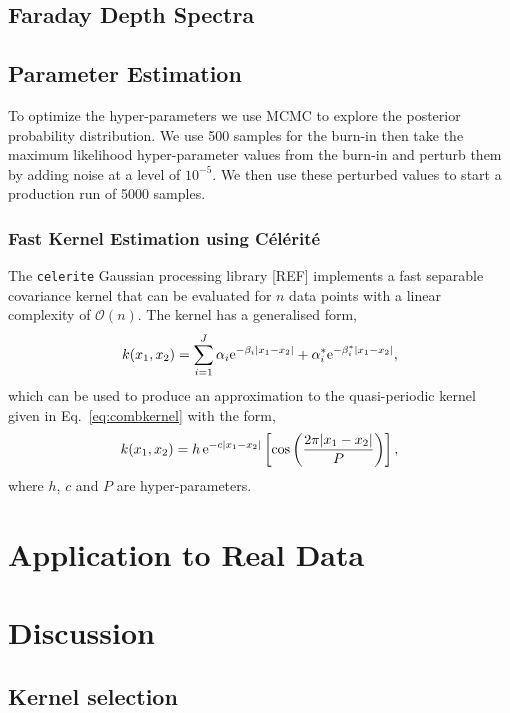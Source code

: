 \documentclass[fleqn,usenatbib]{mnras}
\begin{document}
\subsection{Faraday Depth Spectra}

\subsection{Parameter Estimation}

To optimize the hyper-parameters we use MCMC to explore the posterior probability distribution. We use 500 samples for the burn-in then take the maximum likelihood hyper-parameter values from the burn-in and perturb them by adding noise at a level of $10^{-5}$. We then use these perturbed values to start a production run of 5000 samples.

\subsubsection{Fast Kernel Estimation using C{\'e}l{\'e}rit{\'e}}

The {\tt celerite} Gaussian processing library [REF] implements a fast separable covariance kernel that can be evaluated for $n$ data points with a linear complexity of $\mathcal{O}(n)$. The kernel has a generalised form, 
%
\begin{equation}
    k(x_1,x_2) = \sum_{i=1}^{J}{\alpha_i {\rm e}^{-\beta_i |x_1 - x_2|} + \alpha_i^{\ast} {\rm e}^{-\beta_i^{\ast} |x_1 - x_2|}},
\end{equation}
%
which can be used to produce an approximation to the quasi-periodic kernel given in Eq.~\ref{eq:combkernel} with the form, 
%
\begin{equation}
k(x_1,x_2)=h\,{\rm e}^{-c|x_1 - x_2|}\left[\cos\left(\frac{2\pi|x_1 - x_2|}{P}\right)\right],
\end{equation}
%
where $h$, $c$ and $P$ are hyper-parameters.


\section{Application to Real Data}
\label{sec:realdata}

\section{Discussion}
\label{sec:disc}

\subsection{Kernel selection}
\end{document}

